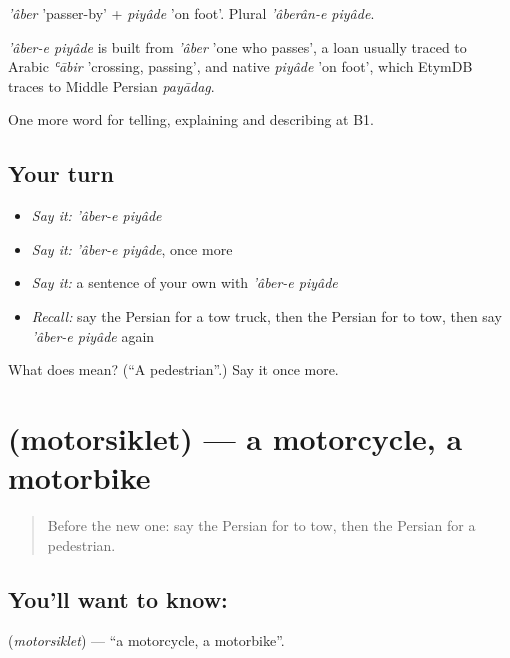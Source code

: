 \emph{'âber} 'passer-by' + \emph{piyâde} 'on foot'. Plural \emph{'âberân-e piyâde}.

\begin{cousinweb}
\emph{'âber-e piyâde} is built from \emph{'âber} 'one who passes', a loan usually traced to Arabic \emph{ʿābir} 'crossing, passing', and native \emph{piyâde} 'on foot', which EtymDB traces to Middle Persian \emph{payādag}.
\end{cousinweb}

\begin{grammarlens}[title={What you've built}]
One more word for telling, explaining and describing at B1.
\end{grammarlens}

\subsection*{Your turn}
\begin{itemize}
\raggedright
  \item \emph{Say it:} \emph{'âber-e piyâde}
  \item \emph{Say it:} \emph{'âber-e piyâde}, once more
  \item \emph{Say it:} a sentence of your own with \emph{'âber-e piyâde}
  \item \emph{Recall:} say the Persian for a tow truck, then the Persian for to tow, then say \emph{'âber-e piyâde} again
\end{itemize}

\begin{tcolorbox}[breakable,colback=teal!4,colframe=teal!35!black,title={Before you move on}]
What does   mean? (\textquotedblleft{}A pedestrian\textquotedblright{}.) Say it once more.
\end{tcolorbox}
\section[\texorpdfstring{\fa{موتورسیکلت} (motorsiklet)}{موتورسیکلت (motorsiklet)}]{ (motorsiklet) — a motorcycle, a motorbike}

\label{lesson:FA-C428-motorsiklet}



\begin{quote}
Before the new one: say the Persian for to tow, then the Persian for a pedestrian.
\end{quote}

\subsection*{You'll want to know: }
\textbf{} (\emph{motorsiklet}) — \textquotedblleft{}a motorcycle, a motorbike\textquotedblright{}.

